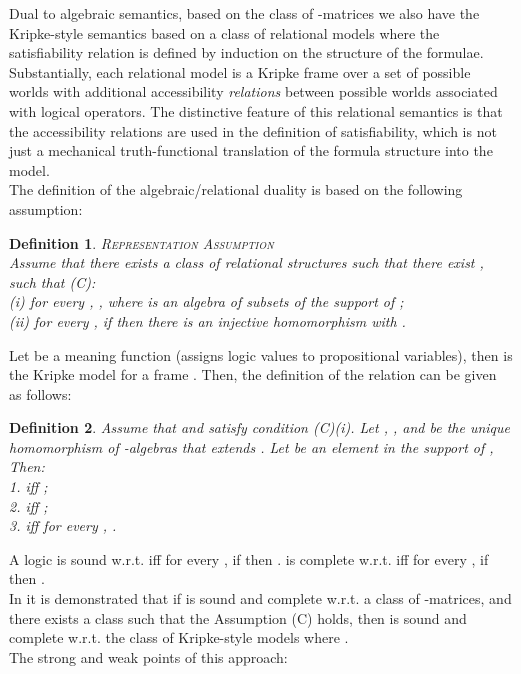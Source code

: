 \documentclass[10pt,twocolumn]{article}
\newtheorem{definition}{Definition}
\begin{document}
 Dual to
algebraic semantics, based on the class  of -matrices we
also have the Kripke-style semantics based on a class  of
relational models where the satisfiability relation  is
defined by induction on the structure of the formulae.
Substantially, each relational model  is a Kripke frame
over a set of possible worlds with additional accessibility
\emph{relations} between possible worlds associated with logical
operators. The distinctive feature of this relational semantics is
that the accessibility relations are used in the definition of
satisfiability, which is not just a mechanical truth-functional
translation of the formula structure into the
model.\\
 The definition of the algebraic/relational duality  is based on the following assumption:
\begin{definition} \textsc{Representation Assumption \cite{Sofr03}} \label{def:abs}\\
Assume that there exists a class  of relational structures such
that there exist ,  such that (C):\\
(i)  for every , , where  is an algebra of subsets of the support of
;\\
(ii) for every , if
 then there is an injective homomorphism
 with
.
\end{definition}
Let  be a meaning function (assigns logic
values to propositional variables), then  is the Kripke
model for a frame . Then, the definition of the relation
 can be given as follows:
\begin{definition} \cite{Sofr03} Assume that  and  satisfy
condition (C)(i). Let ,  , and
 be the unique homomorphism of
-algebras that extends . Let  be an element in the
support of , Then:\\
1.  iff  ;\\
2.  iff  ;\\
3.  iff   for every
, .
\end{definition}
A logic  is sound w.r.t.  iff for every ,
if  then .  is complete
w.r.t.  iff for every  , if  then .\\
In \cite{Sofr03} it is demonstrated that if  is sound and complete w.r.t. a class  of
-matrices, and there exists a class  such that the
Assumption (C) holds, then  is sound and complete w.r.t. the
class of Kripke-style models 
  where .
\\The strong and weak points of this approach:
\end{document}
